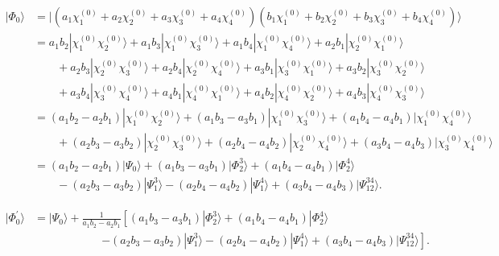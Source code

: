 \documentclass[a4paper]{book}
\newcounter{solution}[chapter]
\begin{document}
	\begin{solution}
	
	\begin{align*}
		| \Phi_0 \rangle &= | ( a_1 \chi^{(0)}_1 + a_2 \chi^{(0)}_2 + a_3 \chi^{(0)}_3 + a_4 \chi^{(0)}_4 ) ( b_1 \chi^{(0)}_1 + b_2 \chi^{(0)}_2 + b_3 \chi^{(0)}_3 + b_4 \chi^{(0)}_4 ) \rangle	\\
		&= a_1 b_2 | \chi^{(0)}_1 \chi^{(0)}_2 \rangle + a_1 b_3 | \chi^{(0)}_1 \chi^{(0)}_3 \rangle + a_1 b_4 | \chi^{(0)}_1 \chi^{(0)}_4 \rangle + a_2 b_1 | \chi^{(0)}_2 \chi^{(0)}_1 \rangle \\
		&\hspace{2em} + a_2 b_3 | \chi^{(0)}_2 \chi^{(0)}_3 \rangle + a_2 b_4 | \chi^{(0)}_2 \chi^{(0)}_4 \rangle + a_3 b_1 | \chi^{(0)}_3 \chi^{(0)}_1 \rangle + a_3 b_2 | \chi^{(0)}_3 \chi^{(0)}_2 \rangle \\
		&\hspace{2em}  + a_3 b_4 | \chi^{(0)}_3 \chi^{(0)}_4 \rangle + a_4 b_1 | \chi^{(0)}_4 \chi^{(0)}_1 \rangle + a_4 b_2 | \chi^{(0)}_4 \chi^{(0)}_2 \rangle + a_4 b_3 | \chi^{(0)}_4 \chi^{(0)}_3 \rangle \\
		&= ( a_1 b_2 - a_2 b_1 ) | \chi^{(0)}_1 \chi^{(0)}_2 \rangle + ( a_1 b_3 - a_3 b_1 ) | \chi^{(0)}_1 \chi^{(0)}_3 \rangle + ( a_1 b_4  - a_4 b_1 ) | \chi^{(0)}_1 \chi^{(0)}_4 \rangle \\
		&\hspace{2em} + ( a_2 b_3 - a_3 b_2 ) | \chi^{(0)}_2 \chi^{(0)}_3 \rangle + ( a_2 b_4 - a_4 b_2 ) | \chi^{(0)}_2 \chi^{(0)}_4 \rangle + ( a_3 b_4  - a_4 b_3 ) | \chi^{(0)}_3 \chi^{(0)}_4 \rangle \\
		&= ( a_1 b_2 - a_2 b_1 ) | \Psi_0 \rangle + ( a_1 b_3 - a_3 b_1 ) | \Phi^3_2 \rangle + ( a_1 b_4  - a_4 b_1 ) | \Phi^4_2 \rangle \\
		&\hspace{2em} - ( a_2 b_3 - a_3 b_2 ) | \Psi^3_1 \rangle - ( a_2 b_4 - a_4 b_2 ) | \Psi^4_1 \rangle + ( a_3 b_4  - a_4 b_3 ) | \Psi^{34}_{12} \rangle.
	\end{align*}		

	\begin{align*}
		| \Phi^\prime_0 \rangle &= | \Psi_0 \rangle + \frac{1}{ a_1 b_2 - a_2 b_1 } \left[ ( a_1 b_3 - a_3 b_1 ) | \Phi^3_2 \rangle + ( a_1 b_4  - a_4 b_1 ) | \Phi^4_2 \rangle \right. \\
		&\hspace{6em} \left. - ( a_2 b_3 - a_3 b_2 ) | \Psi^3_1 \rangle - ( a_2 b_4 - a_4 b_2 ) | \Psi^4_1 \rangle + ( a_3 b_4  - a_4 b_3 ) | \Psi^{34}_{12} \rangle \right].
	\end{align*}
	

\end{solution}
\end{document}
